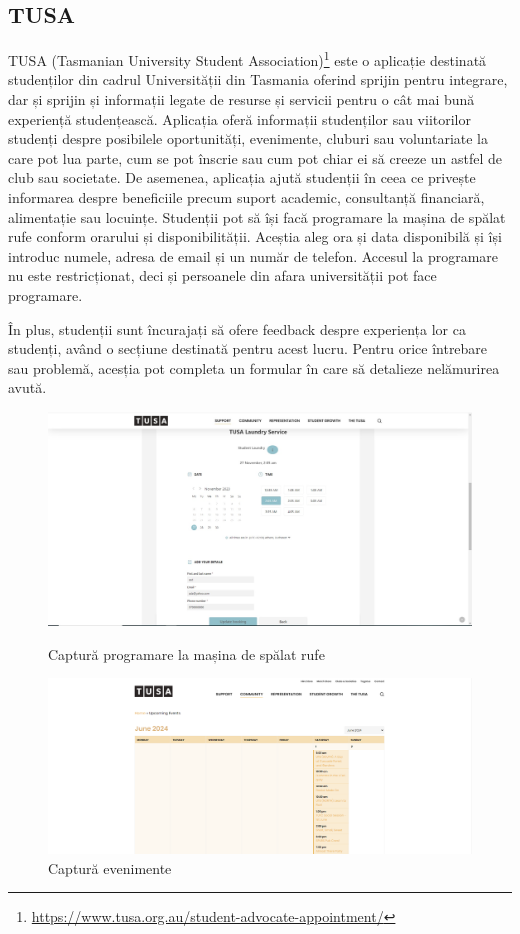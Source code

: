 \documentclass[12pt,a4paper]{report}
\theoremstyle{definition}
\theoremstyle{remark}
\begin{document}
\subsection{TUSA }
\par TUSA (Tasmanian University Student Association)\footnote{\url{https://www.tusa.org.au/student-advocate-appointment/}}  este o aplicație destinată \textnormal{stu\-den\-ți\-lor} din cadrul Universității din Tasmania oferind sprijin pentru integrare, dar și sprijin și informații legate de resurse și servicii pentru o cât mai bună experiență studențească. Aplicația oferă informații studenților sau viitorilor studenți despre posibilele oportunități, evenimente, cluburi sau voluntariate la care pot lua parte, cum se pot înscrie  sau cum pot chiar ei să creeze un astfel de club sau societate. De asemenea, aplicația ajută studenții în ceea ce privește informarea despre beneficiile precum suport academic, consultanță financiară, alimentație sau locuințe. Studenții pot să își facă programare la mașina de spălat rufe conform orarului și disponibilității. Aceștia aleg ora și data disponibilă și își introduc numele, adresa de email și un număr de telefon. Accesul la programare nu este restricționat, deci și persoanele din afara universității pot face programare.
\par În plus, studenții sunt încurajați să ofere feedback despre experiența lor ca studenți, având o secțiune  destinată pentru acest lucru. Pentru orice întrebare sau problemă, acesția pot completa un formular în care să  detalieze nelămurirea avută.

\begin{figure}[H]
    \centering
    \includegraphics[scale=0.26]{resurse/aplicatii_similare/tusa.png}
    \caption{Captură programare la mașina de spălat rufe}
    \vspace{15mm}
    \includegraphics[scale=0.26]{resurse/aplicatii_similare/Tusa_Events.png}
    \caption{Captură evenimente}
\end{figure}
\end{document}
